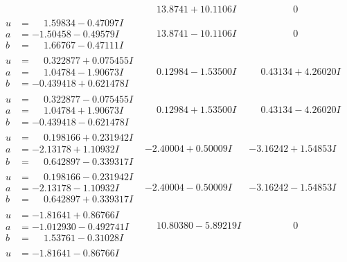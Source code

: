 \documentclass[1p]{elsarticle_modified}
\theoremstyle{definition}
\begin{document}
$$\begin{array}{c|c|c}
 & \phantom{-}13.8741 + 10.1106 I & \phantom{-0.000000 } 0 \\ \hline\begin{aligned}
u &= \phantom{-}1.59834 - 0.47097 I \\
a &= -1.50458 - 0.49579 I \\
b &= \phantom{-}1.66767 - 0.47111 I\end{aligned}
 & \phantom{-}13.8741 - 10.1106 I & \phantom{-0.000000 } 0 \\ \hline\begin{aligned}
u &= \phantom{-}0.322877 + 0.075455 I \\
a &= \phantom{-}1.04784 - 1.90673 I \\
b &= -0.439418 + 0.621478 I\end{aligned}
 & \phantom{-}0.12984 - 1.53500 I & \phantom{-}0.43134 + 4.26020 I \\ \hline\begin{aligned}
u &= \phantom{-}0.322877 - 0.075455 I \\
a &= \phantom{-}1.04784 + 1.90673 I \\
b &= -0.439418 - 0.621478 I\end{aligned}
 & \phantom{-}0.12984 + 1.53500 I & \phantom{-}0.43134 - 4.26020 I \\ \hline\begin{aligned}
u &= \phantom{-}0.198166 + 0.231942 I \\
a &= -2.13178 + 1.10932 I \\
b &= \phantom{-}0.642897 - 0.339317 I\end{aligned}
 & -2.40004 + 0.50009 I & -3.16242 + 1.54853 I \\ \hline\begin{aligned}
u &= \phantom{-}0.198166 - 0.231942 I \\
a &= -2.13178 - 1.10932 I \\
b &= \phantom{-}0.642897 + 0.339317 I\end{aligned}
 & -2.40004 - 0.50009 I & -3.16242 - 1.54853 I \\ \hline\begin{aligned}
u &= -1.81641 + 0.86766 I \\
a &= -1.012930 - 0.492741 I \\
b &= \phantom{-}1.53761 - 0.31028 I\end{aligned}
 & \phantom{-}10.80380 - 5.89219 I & \phantom{-0.000000 } 0 \\ \hline\begin{aligned}
u &= -1.81641 - 0.86766 I \\

\end{aligned}
\end{array}$$
\end{document}

